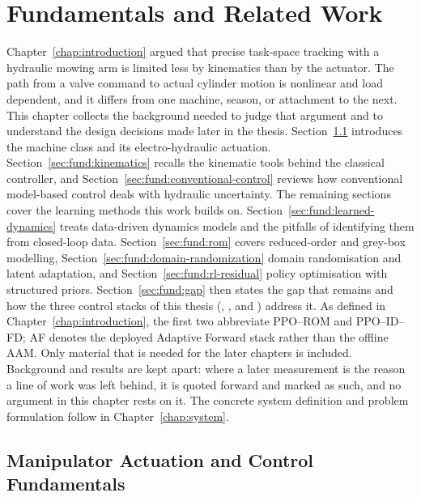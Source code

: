 \chapter{Fundamentals and Related Work}
\label{chap:fundamentals}

Chapter~\ref{chap:introduction} argued that precise task-space tracking
with a hydraulic mowing arm is limited less by kinematics than by the
actuator. The path from a valve command to actual cylinder motion is
nonlinear and load dependent, and it differs from one machine, season, or
attachment to the next. This chapter collects the background needed to
judge that argument and to understand the design decisions made later in
the thesis. Section~\ref{sec:fund:actuation} introduces the machine class
and its electro-hydraulic actuation. Section~\ref{sec:fund:kinematics}
recalls the kinematic tools behind the classical controller, and
Section~\ref{sec:fund:conventional-control} reviews how conventional
model-based control deals with hydraulic uncertainty. The remaining sections cover the learning methods this work builds on.
Section~\ref{sec:fund:learned-dynamics} treats data-driven dynamics models and
the pitfalls of identifying them from closed-loop data.
Section~\ref{sec:fund:rom} covers reduced-order and grey-box modelling,
Section~\ref{sec:fund:domain-randomization} domain randomisation and latent
adaptation, and Section~\ref{sec:fund:rl-residual} policy optimisation with
structured priors.
Section~\ref{sec:fund:gap} then states the gap that remains and how the
three control stacks of this thesis (\ppoROM, \ppoIDFD, and
\ppoAAMFD) address it. As defined in Chapter~\ref{chap:introduction},
the first two abbreviate PPO--ROM and PPO--ID--FD; AF denotes the deployed
Adaptive Forward stack rather than the offline AAM. Only material that is
needed for the later chapters is included. Background and results are kept
apart: where a later measurement is the reason a line of work was left behind,
it is quoted forward and marked as such, and no argument in this chapter rests
on it. The concrete system definition and problem formulation follow in
Chapter~\ref{chap:system}.

\section{Manipulator Actuation and Control Fundamentals}
\label{sec:fund:actuation}

